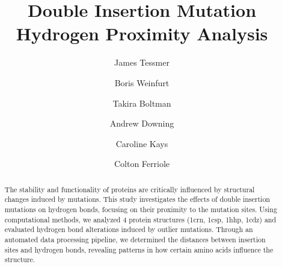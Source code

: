 \documentclass[sigconf, screen, authorversion, authoraddress=false, oneside]{acmart}
\begin{document}
\title{Double Insertion Mutation Hydrogen Proximity Analysis}

\author{James Tessmer}
\author{Boris Weinfurt}
\author{Takira Boltman}
\author{Andrew Downing}
\author{Caroline Kays}
\author{Colton Ferriole}

\begin{abstract}
The stability and functionality of proteins are critically influenced by structural changes induced by mutations. This study investigates the effects of double insertion mutations on hydrogen bonds, focusing on their proximity to the mutation sites. Using computational methods, we analyzed 4 protein structures (1crn, 1csp, 1hhp, 1cdz) and evaluated hydrogen bond alterations induced by outlier mutations. Through an automated data processing pipeline, we determined the distances between insertion sites and hydrogen bonds, revealing patterns in how certain amino acids influence the structure.
\end{abstract}

\maketitle

\end{document}

